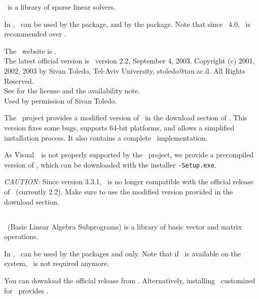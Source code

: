 \taucs\ is a library of sparse linear solvers.

In \cgal, \taucs\ can be used by the 
package, and by the 
package. Note that since \cgal\ 4.0, \eigen\ is recommended over \taucs.

The \taucs\ website is \taucspage.\\
The latest official version is \taucs\ version 2.2, September 4, 2003.
Copyright (c) 2001, 2002, 2003 by Sivan Toledo, Tel-Aviv University,
stoledo@tau.ac.il. All Rights Reserved.\\
See \taucspage{} for the license and the availability note.\\
Used by permission of Sivan Toledo.

The \cgal\ project provides a modified version of \taucs\ in the download
section of \cgalhomepage. This version fixes some bugs,
supports 64-bit platforms, and allows a simplified installation process.
It also contains a complete \lapack\ implementation.

As Visual~\CC\ is not properly
supported by the \taucs\ project, we provide a precompiled version of
\taucs, which can be downloaded with the installer
\texttt{\cgalrel-Setup.exe}.

\emph{CAUTION:} Since version 3.3.1, \cgal\ is no longer compatible with the official
release of \taucs\ (currently 2.2). Make sure to use the modified
version provided in the download section.

\subsection{\blas \label{thirdparty:Blas}}

\blas\ (Basic Linear Algebra Subprograms) is a library of
basic vector and matrix operations.


In \cgal, \blas\ can be used by the packages
and  only.
Note that if \eigen\ is available on the system, \blas\ is not
required anymore.


You can download the official release from \blaspage.
Alternatively, installing \taucs\ customized for \cgal\ provides \blas.

\subsection{\lapack \label{thirdparty:Lapack}}

